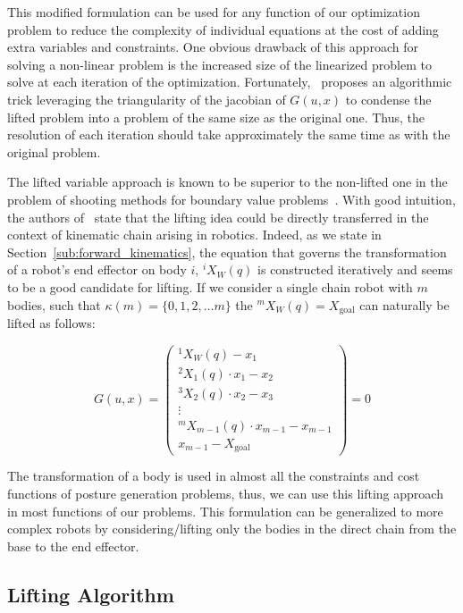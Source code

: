 This modified formulation can be used for any function of our optimization problem to reduce the complexity of individual equations at the cost of adding extra variables and constraints.
One obvious drawback of this approach for solving a non-linear problem is the increased size of the linearized problem to solve at each iteration of the optimization.
Fortunately,~\cite{Albersmeyer:2010:LNM:1958447.1958472} proposes an algorithmic trick leveraging the triangularity of the jacobian of $G(u,x)$ to condense the lifted problem into a problem of the same size as the original one.
Thus, the resolution of each iteration should take approximately the same time as with the original problem.

The lifted variable approach is known to be superior to the non-lifted one in the problem of shooting methods for boundary value problems~\cite{osborne:1969:shooting}.
With good intuition, the authors of~\cite{Albersmeyer:2010:LNM:1958447.1958472} state that the lifting idea could be directly transferred in the context of kinematic chain arising in robotics.
Indeed, as we state in Section~\ref{sub:forward_kinematics}, the equation that governs the transformation of a robot's end effector on body $i$, ${}^i X_W(q)$ is constructed iteratively and seems to be a good candidate for lifting.
If we consider a single chain robot with $m$ bodies, such that $\kappa (m) = \{0, 1, 2, \ldots m\}$ the ${}^m X_W(q) = X_\text{goal}$ can naturally be lifted as follows:

\begin{equation}
\label{eq:robot_lift}
  G(u,x) =
  \begin{pmatrix}
  {}^1 X_W(q) - x_1 \\
  {}^2 X_1(q)\cdot x_1 - x_2\\
  {}^3 X_2(q)\cdot x_2 - x_3 \\
  \vdots \\
  {}^m X_{m-1}(q)\cdot x_{m-1} - x_{m-1} \\
  x_{m-1} - X_\text{goal}
  \end{pmatrix}
  =0
\end{equation}

The transformation of a body is used in almost all the constraints and cost functions of posture generation problems, thus, we can use this lifting approach in most functions of our problems.
This formulation can be generalized to more complex robots by considering/lifting only the bodies in the direct chain from the base to the end effector.

\subsection{Lifting Algorithm}
\label{subsec:LiftingAlgorithm}

